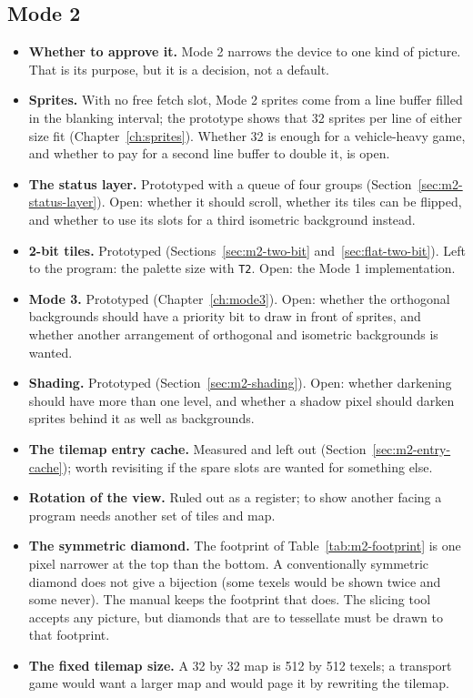 \subsection{Mode 2}

\begin{itemize}
	\item \textbf{Whether to approve it.} Mode 2 narrows the device to one kind of picture. That is its purpose, but it is a
	      decision, not a default.
	\item \textbf{Sprites.} With no free fetch slot, Mode 2 sprites come from a line buffer filled in the blanking
	      interval; the prototype shows that 32 sprites per line of either size fit (Chapter~\ref{ch:sprites}). Whether
	      32 is enough for a vehicle-heavy game, and whether to pay for a second line buffer to double it, is open.
	\item \textbf{The status layer.} Prototyped with a queue of four groups (Section~\ref{sec:m2-status-layer}). Open: whether
	      it should scroll, whether its tiles can be flipped, and whether to use its slots for a third isometric background
	      instead.
	\item \textbf{2-bit tiles.} Prototyped (Sections~\ref{sec:m2-two-bit} and~\ref{sec:flat-two-bit}). Left to the program:
	      the palette size with \texttt{T2}. Open: the Mode 1 implementation.
	\item \textbf{Mode 3.} Prototyped (Chapter~\ref{ch:mode3}). Open: whether the orthogonal backgrounds should have a priority bit to
	      draw in front of sprites, and whether another arrangement of orthogonal and isometric backgrounds is wanted.
	\item \textbf{Shading.} Prototyped (Section~\ref{sec:m2-shading}). Open: whether darkening should have more than one level,
	      and whether a shadow pixel should darken sprites behind it as well as backgrounds.
	\item \textbf{The tilemap entry cache.} Measured and left out (Section~\ref{sec:m2-entry-cache}); worth revisiting if
	      the spare slots are wanted for something else.
	\item \textbf{Rotation of the view.} Ruled out as a register; to show another facing a program needs another set of
	      tiles and map.
	\item \textbf{The symmetric diamond.} The footprint of Table~\ref{tab:m2-footprint} is one pixel narrower at the top than the
	      bottom. A conventionally symmetric diamond does not give a bijection (some texels would be shown twice and
	      some never). The manual keeps the footprint that does. The slicing tool accepts any picture, but diamonds that
	      are to tessellate must be drawn to that footprint.
	\item \textbf{The fixed tilemap size.} A 32 by 32 map is 512 by 512 texels; a transport game would want a larger map and
	      would page it by rewriting the tilemap.
\end{itemize}

